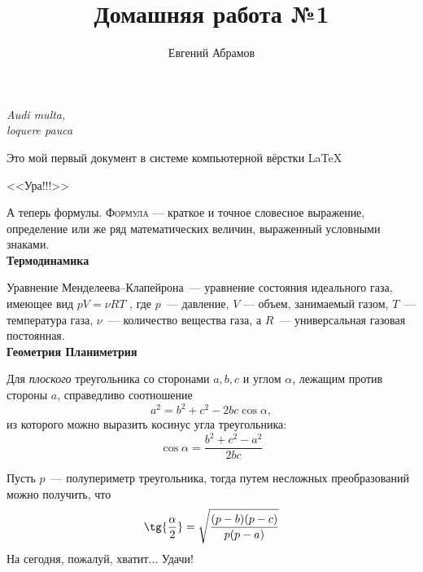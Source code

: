 \documentclass[12pt]{article}
\title{Домашняя работа №1}
\author{Евгений Абрамов}
\date{}
\begin{document}
	\maketitle
	\begin{flushright}
	\textit{Audi multa,\\ loquere pauca}
	\end{flushright}
	\vspace{20pt}
	\par{Это мой первый документ в системе компьютерной вёрстки \LaTeX}
	\begin{center}
	\huge{\textsf{<<Ура!!!>>}}
	\end{center}
	
	А теперь формулы. \textsc{Формула} — краткое и точное словесное выражение, определение или же ряд математических величин, выраженный условными знаками.
	\vspace{15pt}\\
	\hspace*{28pt}\textbf{\Large{Термодинамика}}
	
	Уравнение Менделеева--Клапейрона~--- уравнение состояния идеального газа, имеющее вид $pV = \nu RT$ , где $p$~--- давление, $V$ — объем, занимаемый газом, $T$~--- температура газа, $\nu$~--- количество вещества газа, а $R$~--- универсальная газовая постоянная.
	\vspace{15pt}\\
	\hspace*{28pt}\textbf{\Large{Геометрия} \hfill \Large{Планиметрия}} 
	
	Для \textsl{плоского} треугольника со сторонами $a, b, c$ и углом $\alpha$, лежащим
против стороны $a$, справедливо соотношение
$$a^2 = b^2+ c^2 - 2bc\cos\alpha,$$
из которого можно выразить косинус угла треугольника:
$$\cos \alpha = \frac{b^2 + c^2 - a^2}{2bc}$$
\newpage

Пусть $p$~--- полупериметр треугольника, тогда путем несложных преобразований можно получить, что
$$\tg{\frac{\alpha}{2}} = \sqrt{\frac{(p - b)(p - c)}{p(p - a)}}$$
	\vspace{1cm}
	\hspace*{0pt}На сегодня, пожалуй, хватит$\ldots$ Удачи!
\end{document}
